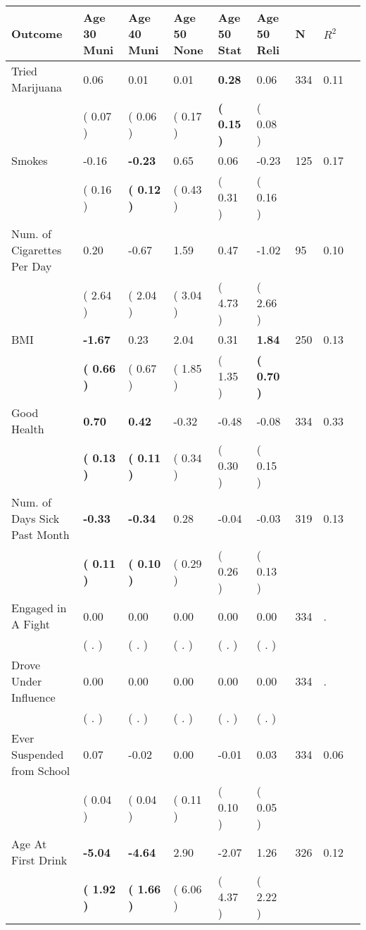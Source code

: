 \begin{tabular}{L{6.2cm} C{1.8cm} C{1.8cm} C{1.8cm} C{1.8cm} C{1.8cm} C{1.8cm} C{0.3cm} C{0.3cm}}
\toprule
 \textbf{Outcome} & \textbf{Age 30 Muni} & \textbf{Age 40 Muni} & \textbf{Age 50 None} & \textbf{Age 50 Stat} & \textbf{Age 50 Reli} & \textbf{N} & \textbf{$ R^2$} \\
\midrule
Tried Marijuana &      0.06 &      0.01 &      0.01 & \textbf{     0.28} &      0.06  & 334 &       0.11 \\ 
 & (     0.07 ) & (     0.06 ) & (     0.17 ) & \textbf{(     0.15 )} & (     0.08 )  & \\
Smokes &     -0.16 & \textbf{    -0.23} &      0.65 &      0.06 &     -0.23  & 125 &       0.17 \\ 
 & (     0.16 ) & \textbf{(     0.12 )} & (     0.43 ) & (     0.31 ) & (     0.16 )  & \\
Num. of Cigarettes Per Day &      0.20 &     -0.67 &      1.59 &      0.47 &     -1.02  & 95 &       0.10 \\ 
 & (     2.64 ) & (     2.04 ) & (     3.04 ) & (     4.73 ) & (     2.66 )  & \\
BMI & \textbf{    -1.67} &      0.23 &      2.04 &      0.31 & \textbf{     1.84}  & 250 &       0.13 \\ 
 & \textbf{(     0.66 )} & (     0.67 ) & (     1.85 ) & (     1.35 ) & \textbf{(     0.70 )}  & \\
Good Health & \textbf{     0.70} & \textbf{     0.42} &     -0.32 &     -0.48 &     -0.08  & 334 &       0.33 \\ 
 & \textbf{(     0.13 )} & \textbf{(     0.11 )} & (     0.34 ) & (     0.30 ) & (     0.15 )  & \\
Num. of Days Sick Past Month & \textbf{    -0.33} & \textbf{    -0.34} &      0.28 &     -0.04 &     -0.03  & 319 &       0.13 \\ 
 & \textbf{(     0.11 )} & \textbf{(     0.10 )} & (     0.29 ) & (     0.26 ) & (     0.13 )  & \\
Engaged in A Fight &      0.00 &      0.00 &      0.00 &      0.00 &      0.00  & 334 &          . \\ 
 & (        . ) & (        . ) & (        . ) & (        . ) & (        . )  & \\
Drove Under Influence &      0.00 &      0.00 &      0.00 &      0.00 &      0.00  & 334 &          . \\ 
 & (        . ) & (        . ) & (        . ) & (        . ) & (        . )  & \\
Ever Suspended from School &      0.07 &     -0.02 &      0.00 &     -0.01 &      0.03  & 334 &       0.06 \\ 
 & (     0.04 ) & (     0.04 ) & (     0.11 ) & (     0.10 ) & (     0.05 )  & \\
Age At First Drink & \textbf{    -5.04} & \textbf{    -4.64} &      2.90 &     -2.07 &      1.26  & 326 &       0.12 \\ 
 & \textbf{(     1.92 )} & \textbf{(     1.66 )} & (     6.06 ) & (     4.37 ) & (     2.22 )  & \\
\bottomrule
\end{tabular}
